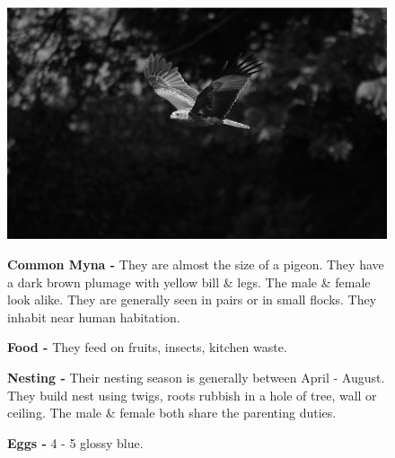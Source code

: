 \begin{figure}[H]
\begin{center}
\includegraphics{figure/Land_birds/01_pariah_kite/pariah-kite.eps}
\end{center}
\medskip
\noindent
{\bf Common Myna -} They are almost the size of a pigeon. They have a dark brown plumage with yellow bill \& legs. The male \& female look alike. They are generally seen in pairs or in small flocks. They inhabit near human habitation.

\medskip
{\bf Food -} They feed on fruits, insects, kitchen waste. 

{\bf Nesting -} Their nesting season is generally between April - August. They build nest using twigs, roots rubbish in a hole of tree, wall or ceiling. The male \& female both share the parenting duties.

{\bf Eggs -} 4 - 5 glossy blue.
\end{figure}

\vfill\eject

~\phantom{a}
\vfill

